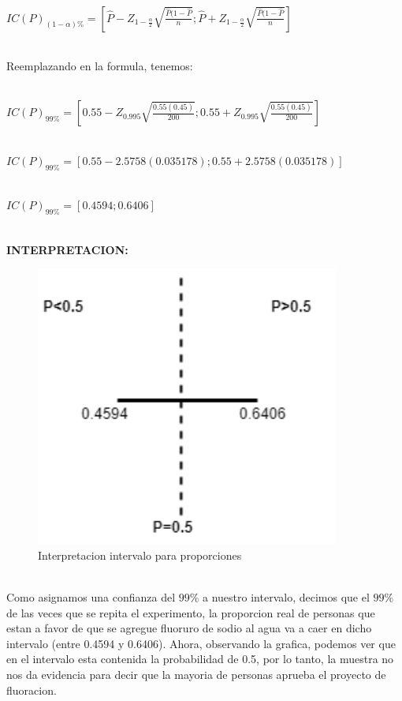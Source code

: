 \documentclass[letterpaper,12pt,onecolumn,titlepage]{article}
\begin{document}
~\\ $IC(P)_{(1-\alpha)\%}=\left[\hat{P}-Z_{1-\frac{\alpha}{2}}\sqrt{\frac{\hat{P}(1-\hat{P}}{n}};\hat{P}+Z_{1-\frac{\alpha}{2}}\sqrt{\frac{\hat{P}(1-\hat{P}}{n}}\right]$

~\\ Reemplazando en la formula, tenemos:

~\\ $IC(P)_{99\%}=\left[0.55-Z_{0.995}\sqrt{\frac{0.55(0.45)}{200}};0.55+Z_{0.995}\sqrt{\frac{0.55(0.45)}{200}}\right]$

~\\ $IC(P)_{99\%}=[0.55-2.5758(0.035178) ; 0.55+2.5758(0.035178)]$

~\\ $IC(P)_{99\%}=[0.4594 ; 0.6406]$

~\\ \textbf{INTERPRETACION:}
 \begin{figure}[!h]
    \begin{center}
        \includegraphics[width=10cm]{Figuras/Grafico1.png}
        \caption{Interpretacion intervalo para proporciones}
        \label{fig:Densidad}
    \end{center}
\end{figure}

~\\ Como asignamos una confianza del $99\%$ a nuestro intervalo, decimos que el $99\%$ de las veces que se repita el experimento, la proporcion real de personas que estan a favor de que se agregue fluoruro de sodio al agua va a caer en dicho intervalo (entre 0.4594 y 0.6406). Ahora, observando la grafica, podemos ver que en el intervalo esta contenida la probabilidad de 0.5, por lo tanto, la muestra no nos da evidencia para decir que la mayoria de personas aprueba el proyecto de fluoracion.
\end{document}
